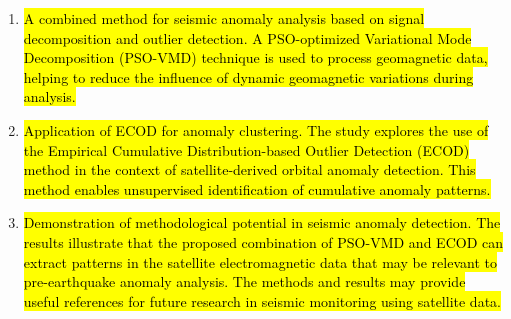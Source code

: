 \documentclass[3p,authoryear,preprint,12pt]{elsarticle}
\begin{document}
\begin{enumerate}
	\item \hl{A combined method for seismic anomaly analysis based on signal decomposition and outlier detection. A PSO-optimized Variational Mode Decomposition (PSO-VMD) technique is used to process geomagnetic data, helping to reduce the influence of dynamic geomagnetic variations during analysis.}
	
	\item \hl{Application of ECOD for anomaly clustering. The study explores the use of the Empirical Cumulative Distribution-based Outlier Detection (ECOD) method in the context of satellite-derived orbital anomaly detection. This method enables unsupervised identification of cumulative anomaly patterns.}
	
	\item \hl{Demonstration of methodological potential in seismic anomaly detection. The results illustrate that the proposed combination of PSO-VMD and ECOD can extract patterns in the satellite electromagnetic data that may be relevant to pre-earthquake anomaly analysis. The methods and results may provide useful references for future research in seismic monitoring using satellite data.}
\end{enumerate}
\end{document}

